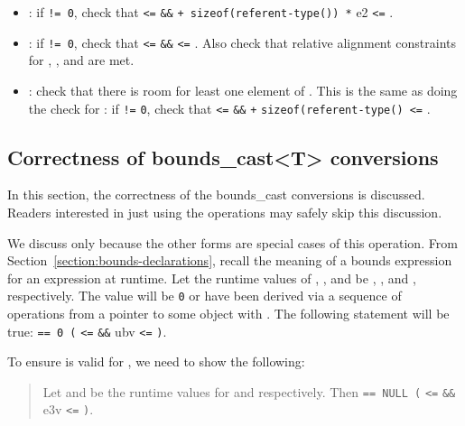 \begin{itemize}
\item
  :
   if  \texttt{!= 0}, check that 
  \texttt{<=}  \texttt{\&\&}  \texttt{+
  sizeof(referent-type(}\texttt{)) *} e2 \texttt{<=}
  .
\item
  : if  \texttt{!= 0},
  check that  \texttt{<=}  \texttt{\&\&}
   \texttt{<=} . Also check that relative
  alignment constraints for , , and  are met.
\item
  :
  check that there is room for least one element of . This is
  the same as doing the check for
  : if  \texttt{!=} \texttt{0}, check that 
  \texttt{<=}  \texttt{\&\&}  \texttt{+}
  \texttt{sizeof(referent-type(}\texttt{) <=}
  .
\end{itemize}

\subsection{Correctness of bounds\_cast\textless{}T\textgreater{} conversions}

In this section, the correctness of the bounds\_cast conversions is
discussed. Readers interested in just using the operations may safely
skip this discussion.

We discuss only
 because the other forms are special cases
of this operation. From Section~\ref{section:bounds-declarations},
recall the meaning of a bounds
expression  for
an expression  at runtime. Let the runtime values of ,
, and  be , , and ,
respectively. The value  will be \texttt{0} or have been
derived via a sequence of operations from a pointer to some object
 with .
The following statement will be true: 
\texttt{== 0 \textbar{}\textbar{} (} \texttt{<=}
 \texttt{\&\&} ubv \texttt{<=}
\texttt{)}.

To ensure  is
valid for , we need to show the following:

\begin{quote}
Let  and  be the runtime values for  and
 respectively. Then  \texttt{== NULL
\textbar{}\textbar{} (} \texttt{<=} 
\texttt{\&\&} e3v \texttt{<=} \texttt{)}.
\end{quote}

